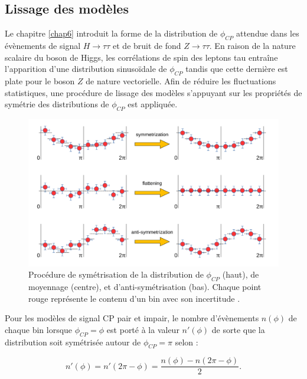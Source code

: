 \subsection{Lissage des modèles}
\label{smoothingSection}

Le chapitre \ref{chap6} introduit la forme de la distribution de $\phi_{CP}$ attendue dans les évènements de signal $H\to \tau\tau$ et de bruit de fond $Z\to \tau\tau$. En raison de la nature scalaire du boson de Higgs, les corrélations de spin des leptons tau entraîne l'apparition d'une distribution sinusoïdale de $\phi_{CP}$ tandis que cette dernière est plate pour le boson $Z$ de nature vectorielle. Afin de réduire les fluctuations statistiques, une procédure de lissage des modèles s'appuyant sur les propriétés de symétrie des distributions de $\phi_{CP}$ est appliquée. \\

\begin{figure}[!ht]
    \centering
    \includegraphics[scale=0.35]{Chapitre7/Images/smoothing.png}
    \caption{Procédure de symétrisation de la distribution de $\phi_{CP}$ (haut), de moyennage (centre), et d'anti-symétrisation (bas). Chaque point rouge représente le contenu d'un bin avec son incertitude \cite{Cardini:2021hbb}.}
    \label{smoothing}
\end{figure}

Pour les modèles de signal CP pair et impair, le nombre d'évènements $n(\phi)$ de chaque bin lorsque $\phi_{CP}=\phi$ est porté à la valeur $n'(\phi)$ de sorte que la distribution soit symétrisée autour de $\phi_{CP}=\pi$ selon :

\begin{equation}
    n'(\phi)=n'(2\pi-\phi)=\frac{n(\phi)-n(2\pi-\phi)}{2}.
\end{equation}

